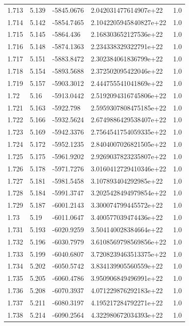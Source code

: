 \begin{tabular}{lllll}
1.713 & 5.139 & -5845.0676 & 2.042031477614907e+22 & 1.0 \\
1.714 & 5.142 & -5854.7465 & 2.1042205945840827e+22 & 1.0 \\
1.715 & 5.145 & -5864.436 & 2.168303652127536e+22 & 1.0 \\
1.716 & 5.148 & -5874.1363 & 2.234338329322791e+22 & 1.0 \\
1.717 & 5.151 & -5883.8472 & 2.302384061836799e+22 & 1.0 \\
1.718 & 5.154 & -5893.5688 & 2.372502095422046e+22 & 1.0 \\
1.719 & 5.157 & -5903.3012 & 2.444755541041869e+22 & 1.0 \\
1.72 & 5.16 & -5913.0442 & 2.5192094316745806e+22 & 1.0 \\
1.721 & 5.163 & -5922.798 & 2.5959307808475185e+22 & 1.0 \\
1.722 & 5.166 & -5932.5624 & 2.6749886429538407e+22 & 1.0 \\
1.723 & 5.169 & -5942.3376 & 2.7564541754059335e+22 & 1.0 \\
1.724 & 5.172 & -5952.1235 & 2.8404007026821505e+22 & 1.0 \\
1.725 & 5.175 & -5961.9202 & 2.9269037823235807e+22 & 1.0 \\
1.726 & 5.178 & -5971.7276 & 3.0160412729410346e+22 & 1.0 \\
1.727 & 5.181 & -5981.5458 & 3.107893404292985e+22 & 1.0 \\
1.728 & 5.184 & -5991.3747 & 3.2025428494979854e+22 & 1.0 \\
1.729 & 5.187 & -6001.2143 & 3.300074799445572e+22 & 1.0 \\
1.73 & 5.19 & -6011.0647 & 3.400577039474436e+22 & 1.0 \\
1.731 & 5.193 & -6020.9259 & 3.504140028384664e+22 & 1.0 \\
1.732 & 5.196 & -6030.7979 & 3.6108569798569856e+22 & 1.0 \\
1.733 & 5.199 & -6040.6807 & 3.7208239463513375e+22 & 1.0 \\
1.734 & 5.202 & -6050.5742 & 3.834139905560559e+22 & 1.0 \\
1.735 & 5.205 & -6060.4786 & 3.950906849496991e+22 & 1.0 \\
1.736 & 5.208 & -6070.3937 & 4.071229876292183e+22 & 1.0 \\
1.737 & 5.211 & -6080.3197 & 4.195217284792271e+22 & 1.0 \\
1.738 & 5.214 & -6090.2564 & 4.322980672034393e+22 & 1.0 \\

\end{tabular}
